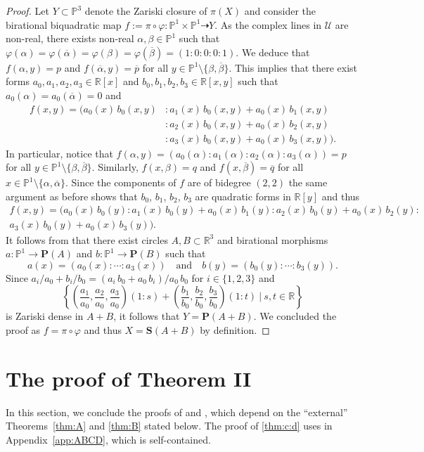 \documentclass[11pt]{article}
\newcommand{\R}{\mathbb{R}}
\renewcommand{\P}{\mathbb{P}}
\newcommand{\bP}{\mathbf{P}}
\newcommand{\bS}{\mathbf{S}}
\newcommand{\cU}{\mathcal{U}}
\newcommand{\op}{{\overline{p}}}
\newcommand{\oq}{{\overline{q}}}
\newcommand{\oalpha}{{\overline{\alpha}}}
\newcommand{\obeta}{{\overline{\beta}}}
\renewcommand{\c}{\colon}
\newcommand{\dto}{\dasharrow}
\newcommand{\set}[2]{\left\{#1 ~|~ #2\right\}}
\newcommand{\st}{such that }
\begin{document}
\begin{proof}
Let $Y\subset\P^3$ denote the Zariski closure of $\pi(X)$
and consider the birational biquadratic map
$f:=\pi\circ\varphi\c\P^1\times\P^1\dto Y$.
As the complex lines in $\cU$ are non-real,
there exists non-real $\alpha,\beta\in\P^1$ \st
$\varphi(\alpha)=\varphi(\oalpha)=\varphi(\beta)=\varphi(\obeta)=(1:0:0:0:1)$.
We deduce that $f(\alpha,y)=p$ and $f\left(\oalpha,y\right)=\op$
for all $y\in\P^1\setminus\{\beta,\obeta\}$.
This implies that there exist forms $a_0,a_1,a_2,a_3\in\R[x]$ and $b_0,b_1,b_2,b_3\in\R[x,y]$
\st $a_0(\alpha)=a_0(\oalpha)=0$ and
\begin{align*}
f(x,y)=(a_0(x)\,b_0(x,y)&:a_1(x)\,b_0(x,y)+a_0(x)\,b_1(x,y)\\
                        &:a_2(x)\,b_0(x,y)+a_0(x)\,b_2(x,y)\\
                        &:a_3(x)\,b_0(x,y)+a_0(x)\,b_3(x,y)).
\end{align*}
In particular, notice that $f(\alpha,y)=(a_0(\alpha):a_1(\alpha):a_2(\alpha):a_3(\alpha))=p$
for all $y\in\P^1\setminus\{\beta,\obeta\}$.
Similarly, $f(x,\beta)=q$ and $f\left(x,\obeta\right)=\oq$ for all $x\in\P^1\setminus\{\alpha,\oalpha\}$.
Since the components of $f$ are of bidegree $(2,2)$ the same argument as before shows that
$b_0$, $b_1$, $b_2$, $b_3$ are quadratic forms in $\R[y]$ and thus
\begin{multline*}
f(x,y)=(a_0(x)\,b_0(y):
a_1(x)\,b_0(y)+a_0(x)\,b_1(y):
a_2(x)\,b_0(y)+a_0(x)\,b_2(y):\\
a_3(x)\,b_0(y)+a_0(x)\,b_3(y)).
\end{multline*}
It follows from  that there exist circles $A,B\subset \R^3$
and birational morphisms $a\c \P^1\to\bP(A)$ and $b\c\P^1\to\bP(B)$
\st
\[
a(x)=(a_0(x):\cdots:a_3(x))
\quad\text{and}\quad
b(y)=(b_0(y):\cdots:b_3(y)).
\]
Since $a_i/a_0+b_i/b_0=(a_i\,b_0+a_0\,b_i)/a_0\,b_0$ for $i\in\{1,2,3\}$ and
\[
\set{
\left(\frac{a_1}{a_0},\frac{a_2}{a_0},\frac{a_3}{a_0}\right)(1:s)+
\left(\frac{b_1}{b_0},\frac{b_2}{b_0},\frac{b_3}{b_0}\right)(1:t)
}{s,t\in\R}
\]
is Zariski dense in $A+B$, it follows that $Y=\bP(A+B)$.
We concluded the proof as $f=\pi\circ\varphi$ and thus $X=\bS(A+B)$ by definition.
\end{proof}

\section{The proof of Theorem II}
\label{sec:proof}

In this section, we conclude the proofs of  and ,
which depend on the ``external'' Theorems~\ref{thm:A} and \ref{thm:B} stated below.
The proof of \ref{thm:c:d} uses 
in Appendix~\ref{app:ABCD}, which is self-contained.
\end{document}
